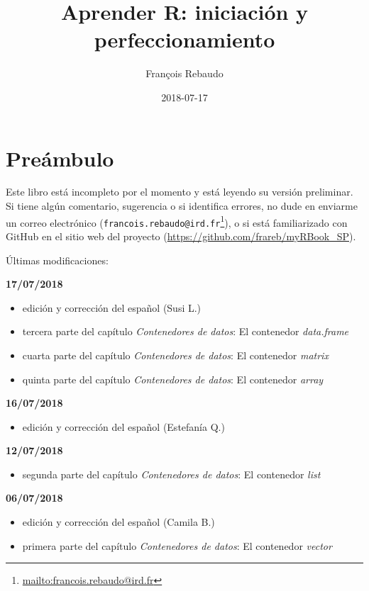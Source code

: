 \documentclass[]{book}
\title{Aprender R: iniciación y perfeccionamiento}
\author{François Rebaudo}
\date{2018-07-17}
\providecommand{\tightlist}{%
  \setlength{\itemsep}{0pt}\setlength{\parskip}{0pt}}
\let\rmarkdownfootnote\footnote%
\def\footnote{\protect\rmarkdownfootnote}
\renewcommand{\href}[2]{#2\footnote{\url{#1}}}
\begin{document}
\maketitle

{
\setcounter{tocdepth}{1}
\tableofcontents
}
\chapter{Preámbulo}\label{preambulo}

Este libro está incompleto por el momento y está leyendo su versión
preliminar. Si tiene algún comentario, sugerencia o si identifica
errores, no dude en enviarme un correo electrónico
(\href{mailto:francois.rebaudo@ird.fr}{\nolinkurl{francois.rebaudo@ird.fr}}),
o si está familiarizado con GitHub en el sitio web del proyecto
(\url{https://github.com/frareb/myRBook_SP}).

Últimas modificaciones:

\textbf{17/07/2018}

\begin{itemize}
\tightlist
\item
  edición y corrección del español (Susi L.)
\item
  tercera parte del capítulo \emph{Contenedores de datos}: El contenedor
  \emph{data.frame}
\item
  cuarta parte del capítulo \emph{Contenedores de datos}: El contenedor
  \emph{matrix}
\item
  quinta parte del capítulo \emph{Contenedores de datos}: El contenedor
  \emph{array}
\end{itemize}

\textbf{16/07/2018}

\begin{itemize}
\tightlist
\item
  edición y corrección del español (Estefanía Q.)
\end{itemize}

\textbf{12/07/2018}

\begin{itemize}
\tightlist
\item
  segunda parte del capítulo \emph{Contenedores de datos}: El contenedor
  \emph{list}
\end{itemize}

\textbf{06/07/2018}

\begin{itemize}
\tightlist
\item
  edición y corrección del español (Camila B.)
\item
  primera parte del capítulo \emph{Contenedores de datos}: El contenedor
  \emph{vector}
\end{itemize}
\end{document}
